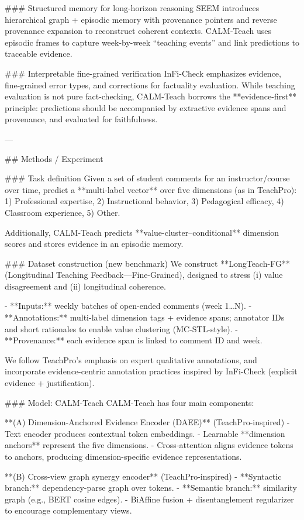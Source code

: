 ### Structured memory for long-horizon reasoning  
SEEM introduces hierarchical graph + episodic memory with provenance pointers and reverse provenance expansion to reconstruct coherent contexts. CALM-Teach uses episodic frames to capture week-by-week “teaching events” and link predictions to traceable evidence.

### Interpretable fine-grained verification  
InFi-Check emphasizes evidence, fine-grained error types, and corrections for factuality evaluation. While teaching evaluation is not pure fact-checking, CALM-Teach borrows the **evidence-first** principle: predictions should be accompanied by extractive evidence spans and provenance, and evaluated for faithfulness.

---

## Methods / Experiment  

### Task definition  
Given a set of student comments for an instructor/course over time, predict a **multi-label vector** over five dimensions (as in TeachPro):  
1) Professional expertise, 2) Instructional behavior, 3) Pedagogical efficacy, 4) Classroom experience, 5) Other.

Additionally, CALM-Teach predicts **value-cluster–conditional** dimension scores and stores evidence in an episodic memory.

### Dataset construction (new benchmark)  
We construct **LongTeach-FG** (Longitudinal Teaching Feedback—Fine-Grained), designed to stress (i) value disagreement and (ii) longitudinal coherence.

- **Inputs:** weekly batches of open-ended comments (week 1…N).  
- **Annotations:** multi-label dimension tags + evidence spans; annotator IDs and short rationales to enable value clustering (MC-STL-style).  
- **Provenance:** each evidence span is linked to comment ID and week.

We follow TeachPro’s emphasis on expert qualitative annotations, and incorporate evidence-centric annotation practices inspired by InFi-Check (explicit evidence + justification).

### Model: CALM-Teach  
CALM-Teach has four main components:

**(A) Dimension-Anchored Evidence Encoder (DAEE)** (TeachPro-inspired)  
- Text encoder produces contextual token embeddings.  
- Learnable **dimension anchors** represent the five dimensions.  
- Cross-attention aligns evidence tokens to anchors, producing dimension-specific evidence representations.

**(B) Cross-view graph synergy encoder** (TeachPro-inspired)  
- **Syntactic branch:** dependency-parse graph over tokens.  
- **Semantic branch:** similarity graph (e.g., BERT cosine edges).  
- BiAffine fusion + disentanglement regularizer to encourage complementary views.

